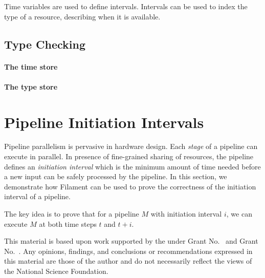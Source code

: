 \documentclass[acmsmall,review,anonymous]{acmart}
\begin{document}
Time variables are used to define intervals.
Intervals can be used to index the type of a resource, describing when it is available.


\subsection{Type Checking}

\paragraph{The time store}

\paragraph{The type store}

\ottdefncheck

\section{Pipeline Initiation Intervals}
Pipeline parallelism is pervasive in hardware design.
Each \emph{stage} of a pipeline can execute in parallel.
In presence of fine-grained sharing of resources, the pipeline defines an \emph{initiation interval}
which is the minimum amount of time needed before a new input can be safely processed by the pipeline.
In this section, we demonstrate how Filament can be used to prove the correctness of the initiation interval of a pipeline.

The key idea is to prove that for a pipeline $M$ with initiation interval $i$, we can execute $M$ at both time steps $t$ and $t+i$.


\begin{acks}
  This material is based upon work supported by the
   under Grant
  No.~ and Grant
  No.~.  Any opinions, findings, and
  conclusions or recommendations expressed in this material are those
  of the author and do not necessarily reflect the views of the
  National Science Foundation.
\end{acks}


% 
\end{document}
